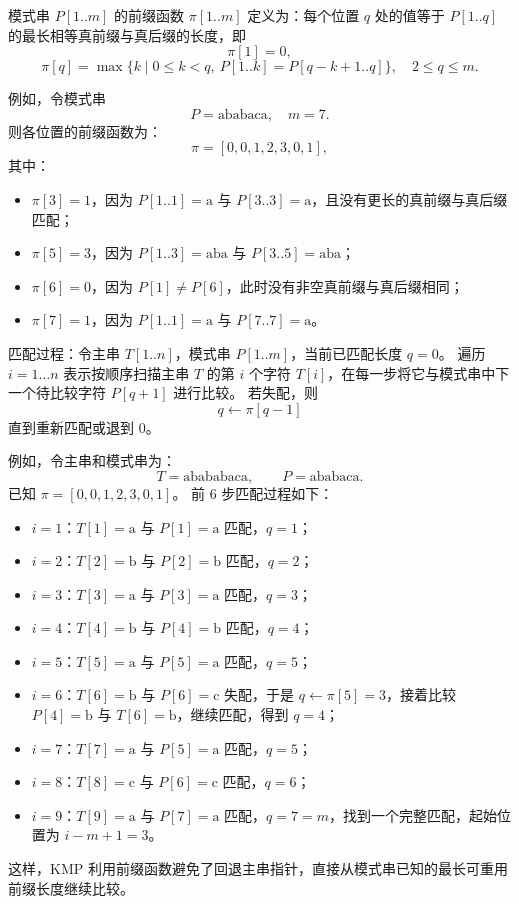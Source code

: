 \documentclass[12pt]{article}
\begin{document}
\begin{defn}[前缀函数]
  模式串 $P[1..m]$ 的前缀函数 $\pi[1..m]$ 定义为：每个位置 $q$ 处的值等于 $P[1..q]$ 的最长相等真前缀与真后缀的长度，即
  \[
    \pi[1] = 0,
  \]
  \[
    \pi[q] = \max\{k \mid 0 \le k < q,\ P[1..k] = P[q-k+1..q]\},\quad 2 \le q \le m.
  \]
\end{defn}
例如，令模式串
\[
  P = \text{ababaca},\quad m = 7.
\]
则各位置的前缀函数为：
\[
  \pi = [0, 0, 1, 2, 3, 0, 1],
\]
其中：
\begin{itemize}
  \item $\pi[3]=1$，因为 $P[1..1]=\text{a}$ 与 $P[3..3]=\text{a}$，且没有更长的真前缀与真后缀匹配；
  \item $\pi[5]=3$，因为 $P[1..3]=\text{aba}$ 与 $P[3..5]=\text{aba}$；
  \item $\pi[6]=0$，因为 $P[1] \neq P[6]$，此时没有非空真前缀与真后缀相同；
  \item $\pi[7]=1$，因为 $P[1..1]=\text{a}$ 与 $P[7..7]=\text{a}$。
\end{itemize}
匹配过程：令主串 $T[1..n]$，模式串 $P[1..m]$，当前已匹配长度 $q=0$。
遍历 $i=1\dots n$ 表示按顺序扫描主串 $T$ 的第 $i$ 个字符 $T[i]$，在每一步将它与模式串中下一个待比较字符 $P[q+1]$ 进行比较。
若失配，则
\[
  q \leftarrow \pi[q-1]
\]
直到重新匹配或退到 $0$。

例如，令主串和模式串为：
\[
  T = \text{abababaca},\qquad P = \text{ababaca}.
\]
已知 $\pi = [0,0,1,2,3,0,1]$。
前 6 步匹配过程如下：
\begin{itemize}
  \item $i=1$：$T[1]=\text{a}$ 与 $P[1]=\text{a}$ 匹配，$q=1$；
  \item $i=2$：$T[2]=\text{b}$ 与 $P[2]=\text{b}$ 匹配，$q=2$；
  \item $i=3$：$T[3]=\text{a}$ 与 $P[3]=\text{a}$ 匹配，$q=3$；
  \item $i=4$：$T[4]=\text{b}$ 与 $P[4]=\text{b}$ 匹配，$q=4$；
  \item $i=5$：$T[5]=\text{a}$ 与 $P[5]=\text{a}$ 匹配，$q=5$；
  \item $i=6$：$T[6]=\text{b}$ 与 $P[6]=\text{c}$ 失配，于是 $q \leftarrow \pi[5] = 3$，接着比较 $P[4]=\text{b}$ 与 $T[6]=\text{b}$，继续匹配，得到 $q=4$；
  \item $i=7$：$T[7]=\text{a}$ 与 $P[5]=\text{a}$ 匹配，$q=5$；
  \item $i=8$：$T[8]=\text{c}$ 与 $P[6]=\text{c}$ 匹配，$q=6$；
  \item $i=9$：$T[9]=\text{a}$ 与 $P[7]=\text{a}$ 匹配，$q=7=m$，找到一个完整匹配，起始位置为 $i-m+1 = 3$。
\end{itemize}
这样，KMP 利用前缀函数避免了回退主串指针，直接从模式串已知的最长可重用前缀长度继续比较。
\end{document}
